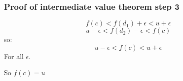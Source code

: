\documentclass{beamer}
\numberwithin{equation}{section}
\begin{document}
\begin{frame}
\frametitle{Proof of intermediate value theorem step 3}
$$ f(c)<f(d_1)+\epsilon<u+\epsilon$$
$$u-\epsilon<f(d_2)-\epsilon< f(c)$$\pause
so:\pause
$$u-\epsilon< f(c)<u+\epsilon$$
For all $\epsilon$.\pause

So $f(c)=u$
\end{frame}


%

\end{document}

